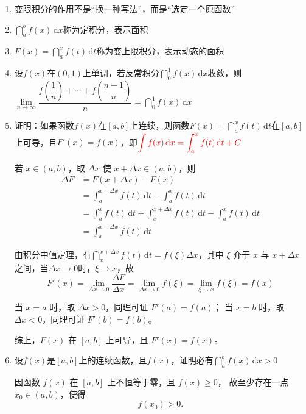 \documentclass[../book.tex]{subfiles}
\begin{document}
\begin{enumerate}
\begin{analysisbox}
            \[
                \boxed{
                    y(x)
                    =
                    y(x_0)
                    +
                    \int_{x_0}^{x} y'(t)\,\mathrm{d}t.
                }
            \]
        \end{analysisbox}
        \item 变限积分的作用不是“换一种写法”，而是“选定一个原函数”
        \item $\dint_a^b f(x)\,\mathrm{d}x$称为定积分，表示面积
        \item $F(x) = \dint_a^x f(t)\,\mathrm{d}t$称为变上限积分，表示动态的面积
        \item 设$f(x)$在$(0, 1)$上单调，若反常积分$\dint_0^1 f(x)\,\mathrm{d}x$收敛，则$\lim\limits_{n\to \infty} \dfrac{f(\dfrac{1}{n}) + \cdots + f(\dfrac{n - 1}{n})}{n} = \dint_0^1 f(x)\,\mathrm{d}x$
        \item 证明：如果函数$f(x)$在$[a, b]$上连续，则函数$F(x) = \dint_a^x f(t)\,\mathrm{d}t$在$[a, b]$上可导，且$F'(x) = f(x)$，即$\color{red}{\displaystyle\int f(x)\,\mathrm{d}x = \displaystyle\int_a^x f(t)\,\mathrm{d}t + C}$
        \begin{analysisbox}[证]
            若 $x\in(a,b)$，取 $\Delta x$ 使 $x+\Delta x\in(a,b)$，则
            \[
                \begin{aligned}
                    \Delta F
                    &= F(x+\Delta x)-F(x) \\
                    &= \int_a^{x+\Delta x} f(t)\,\mathrm{d}t - \int_a^{x} f(t)\,\mathrm{d}t \\
                    &= \int_a^{x} f(t)\,\mathrm{d}t + \int_x^{x+\Delta x} f(t)\,\mathrm{d}t - \int_a^{x} f(t)\,\mathrm{d}t \\
                    &= \int_x^{x+\Delta x} f(t)\,\mathrm{d}t
                \end{aligned}
            \]

            由积分中值定理，有$\dint_x^{x + \Delta x} f(t)\,\mathrm{d}t = f(\xi)\Delta x$，其中 $\xi$ 介于 $x$ 与 $x+\Delta x$ 之间，当$\Delta x\to 0$时，$\xi \to x$，故
            \[
                F'(x) = \lim_{\Delta x\to 0}\frac{\Delta F}{\Delta x}  = \lim_{\Delta x\to 0} f(\xi) = \lim_{\xi\to x} f(\xi) = f(x)
            \]

            当 $x=a$ 时，取 $\Delta x>0$，同理可证 $F'(a)=f(a)$；
            当 $x=b$ 时，取 $\Delta x<0$，同理可证 $F'(b)=f(b)$。

            综上，$F(x)$ 在 $[a,b]$ 上可导，且 $F'(x)=f(x)$。
        \end{analysisbox}
        \item 设$f(x)$是$[a, b]$上{\color{red}{非负}}的连续函数，且$f(x)${\color{red}{不恒等于零}}，证明必有$\dint_a^b f(x)\,\mathrm{d}x > 0$
        \begin{analysisbox}[证]
            因函数 $f(x)$ 在 $[a,b]$ 上不恒等于零，且 $f(x)\ge 0$，
            故至少存在一点 $x_0\in(a,b)$，使得
            \[
                f(x_0)>0.
            \]


\end{analysisbox}
\end{enumerate}
\end{document}
